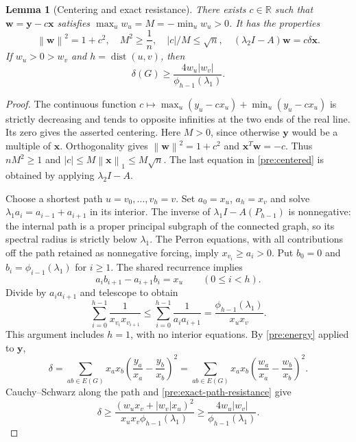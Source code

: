 \documentclass[11pt,a4paper]{article}
\numberwithin{equation}{section}
\newtheorem{lemma}[theorem]{Lemma}
\theoremstyle{definition}
\theoremstyle{remark}
\newcommand{\norm}[1]{\left\lVert#1\right\rVert}
\newcommand{\dist}{\operatorname{dist}}
\begin{document}
\begin{lemma}[Centering and exact resistance]\label{pre:center}
There exists $c\in\mathbb R$ such that $\mathbf w=\mathbf y-c\mathbf x$
satisfies $\max_u w_u=M=-\min_u w_u>0$. It has the properties
\begin{equation}\label{pre:centered}
 \norm{\mathbf w}^2=1+c^2,\quad M^2\ge\frac1n,\quad
 |c|/M\le\sqrt n,\quad (\lambda_2I-A)\mathbf w=c\delta\mathbf x.
\end{equation}
If $w_u>0>w_v$ and $h=\dist(u,v)$, then
\begin{equation}\label{pre:exact-resistance}
 \delta(G)\ge\frac{4w_u|w_v|}{\phi_{h-1}(\lambda_1)}.
\end{equation}
\end{lemma}
\begin{proof}
The continuous function
$c\mapsto\max_u(y_u-cx_u)+\min_u(y_u-cx_u)$ is strictly decreasing
and tends to opposite infinities at the two ends of the real line. Its
zero gives the asserted centering. Here $M>0$, since otherwise
$\mathbf y$ would be a multiple of $\mathbf x$. Orthogonality gives
$\norm{\mathbf w}^2=1+c^2$ and $\mathbf x^T\mathbf w=-c$.
Thus $nM^2\ge1$ and $|c|\le M\norm{\mathbf x}_1\le M\sqrt n$.
The last equation in \eqref{pre:centered} is obtained by applying
$\lambda_2I-A$.

Choose a shortest path $u=v_0,\ldots,v_h=v$. Set $a_0=x_u$, $a_h=x_v$
and solve $\lambda_1a_i=a_{i-1}+a_{i+1}$ in its interior. The inverse
of $\lambda_1I-A(P_{h-1})$ is nonnegative: the internal path is a proper
principal subgraph of the connected graph, so its spectral radius is
strictly below $\lambda_1$. The Perron equations, with all contributions
off the path retained as nonnegative forcing, imply $x_{v_i}\ge a_i>0$.
Put $b_0=0$ and $b_i=\phi_{i-1}(\lambda_1)$ for $i\ge1$.
The shared recurrence implies
\[
 a_ib_{i+1}-a_{i+1}b_i=x_u\qquad(0\le i<h).
\]
Divide by $a_ia_{i+1}$ and telescope to obtain
\begin{equation}\label{pre:exact-path-resistance}
 \sum_{i=0}^{h-1}\frac1{x_{v_i}x_{v_{i+1}}}
 \le\sum_{i=0}^{h-1}\frac1{a_ia_{i+1}}
 =\frac{\phi_{h-1}(\lambda_1)}{x_ux_v}.
\end{equation}
This argument includes $h=1$, with no interior equations.
By \eqref{pre:energy} applied to $\mathbf y$,
\[
 \delta=\sum_{ab\in E(G)}x_ax_b
 \left(\frac{y_a}{x_a}-\frac{y_b}{x_b}\right)^2
 =\sum_{ab\in E(G)}x_ax_b
 \left(\frac{w_a}{x_a}-\frac{w_b}{x_b}\right)^2.
\]
Cauchy--Schwarz along the path and
\eqref{pre:exact-path-resistance} give
\[
 \delta\ge
 \frac{(w_ux_v+|w_v|x_u)^2}{x_ux_v\phi_{h-1}(\lambda_1)}
 \ge\frac{4w_u|w_v|}{\phi_{h-1}(\lambda_1)}.
\]
\end{proof}
\end{document}
